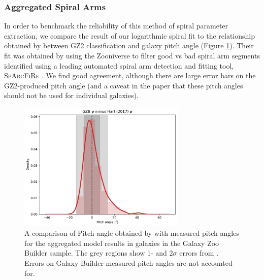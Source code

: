 \documentclass[../main.tex]{subfiles}
\begin{document}
\subsubsection{Aggregated Spiral Arms}
In order to benchmark the reliability of this method of spiral parameter extraction, we compare the result of our logarithmic spiral fit to the relationship obtained by \citet{Hart2016:1607.01019v1} between GZ2 classification and galaxy pitch angle (Figure \ref{fig:hart_pitch_angle}). Their fit was obtained by using the Zooniverse to filter good vs bad spiral arm segments identified using a leading automated spiral arm detection and fitting tool, \textsc{SpArcFiRe} \citep{Davis2014:1402.1910v1}. We find good agreement, although there are large error bars on the GZ2-produced pitch angle (and a caveat in the paper that these pitch angles should not be used for individual galaxies).

\begin{figure}
  \includegraphics[width=8cm]{images__results/gzb-hart-comparison.pdf}
  \caption{A comparison of Pitch angle obtained by \citet{Hart2016:1607.01019v1} with measured pitch angles for the aggregated model results in galaxies in the Galaxy Zoo Builder sample. The grey regions show 1- and $2\sigma$ errors from \citet{Hart2016:1607.01019v1}. Errors on Galaxy Builder-measured pitch angles are not accounted for.}
  \label{fig:hart_pitch_angle}
\end{figure}

\end{document}
